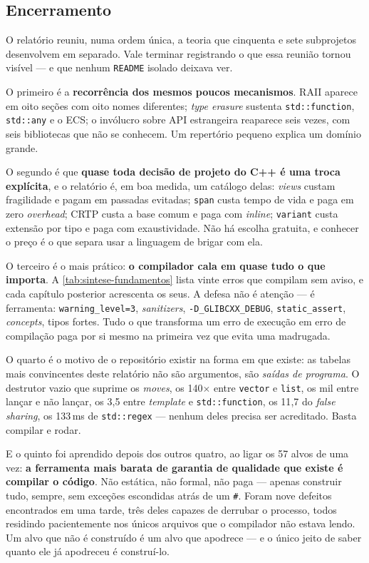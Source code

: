 \subsection{Encerramento}

O relatório reuniu, numa ordem única, a teoria que cinquenta e sete
subprojetos desenvolvem em separado. Vale terminar registrando o que essa
reunião tornou visível --- e que nenhum \texttt{README} isolado deixava ver.

O primeiro é a \textbf{recorrência dos mesmos poucos mecanismos}. RAII aparece em
oito seções com oito nomes diferentes; \emph{type erasure} sustenta
\texttt{std::function}, \texttt{std::any} e o ECS; o invólucro sobre API
estrangeira reaparece seis vezes, com seis bibliotecas que não se conhecem. Um
repertório pequeno explica um domínio grande.

O segundo é que \textbf{quase toda decisão de projeto do C++ é uma troca
explícita}, e o relatório é, em boa medida, um catálogo delas: \emph{views}
custam fragilidade e pagam em passadas evitadas; \texttt{span} custa tempo de
vida e paga em zero \emph{overhead}; CRTP custa a base comum e paga com
\emph{inline}; \texttt{variant} custa extensão por tipo e paga com
exaustividade. Não há escolha gratuita, e conhecer o preço é o que separa usar a
linguagem de brigar com ela.

O terceiro é o mais prático: \textbf{o compilador cala em quase tudo o que
importa}. A \cref{tab:sintese-fundamentos} lista vinte erros que compilam sem
aviso, e cada capítulo posterior acrescenta os seus. A defesa não é atenção ---
é ferramenta: \texttt{warning\_level=3}, \emph{sanitizers},
\texttt{-D\_GLIBCXX\_DEBUG}, \texttt{static\_assert}, \emph{concepts}, tipos
fortes. Tudo o que transforma um erro de execução em erro de compilação paga por
si mesmo na primeira vez que evita uma madrugada.

O quarto é o motivo de o repositório existir na forma em que existe: as
tabelas mais convincentes deste relatório não são argumentos, são \emph{saídas
de programa}. O destrutor vazio que suprime os \emph{moves}, os 140$\times$ entre
\texttt{vector} e \texttt{list}, os mil entre lançar e não lançar, os 3{,}5 entre
\emph{template} e \texttt{std::function}, os 11{,}7 do \emph{false sharing}, os
133\,ms de \texttt{std::regex} --- nenhum deles precisa ser acreditado. Basta
compilar e rodar.

E o quinto foi aprendido depois dos outros quatro, ao ligar os 57 alvos de uma
vez: \textbf{a ferramenta mais barata de garantia de qualidade que existe é
compilar o código}. Não estática, não formal, não paga --- apenas construir
tudo, sempre, sem exceções escondidas atrás de um \texttt{\#}. Foram nove
defeitos encontrados em uma tarde, três deles capazes de derrubar o processo,
todos residindo pacientemente nos únicos arquivos que o compilador não estava
lendo. Um alvo que não é construído é um alvo que apodrece --- e o único jeito
de saber quanto ele já apodreceu é construí-lo.
